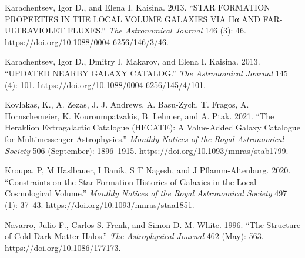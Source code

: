 \documentclass[
]{article}
\newlength{\cslhangindent}
\newenvironment{CSLReferences}[2] %
 {\begin{list}{}{%
  \setlength{\itemindent}{0pt}
  \setlength{\leftmargin}{0pt}
  \setlength{\parsep}{0pt}
  \ifodd #1
   \setlength{\leftmargin}{\cslhangindent}
   \setlength{\itemindent}{-1\cslhangindent}
  \fi
  \setlength{\itemsep}{#2\baselineskip}}}
 {\end{list}}
\begin{document}
\label{refs}
\begin{CSLReferences}{1}{0}
Karachentsev, Igor D., and Elena I. Kaisina. 2013. {``{STAR FORMATION
PROPERTIES IN THE LOCAL VOLUME GALAXIES VIA Hα AND FAR-ULTRAVIOLET
FLUXES}.''} \emph{The Astronomical Journal} 146 (3): 46.
\url{https://doi.org/10.1088/0004-6256/146/3/46}.

Karachentsev, Igor D., Dmitry I. Makarov, and Elena I. Kaisina. 2013.
{``{UPDATED NEARBY GALAXY CATALOG}.''} \emph{The Astronomical Journal}
145 (4): 101. \url{https://doi.org/10.1088/0004-6256/145/4/101}.

Kovlakas, K., A. Zezas, J. J. Andrews, A. Basu-Zych, T. Fragos, A.
Hornschemeier, K. Kouroumpatzakis, B. Lehmer, and A. Ptak. 2021. {``The
{Heraklion Extragalactic Catalogue} ({HECATE}): A Value-Added Galaxy
Catalogue for Multimessenger Astrophysics.''} \emph{Monthly Notices of
the Royal Astronomical Society} 506 (September): 1896--1915.
\url{https://doi.org/10.1093/mnras/stab1799}.

Kroupa, P, M Haslbauer, I Banik, S T Nagesh, and J Pflamm-Altenburg.
2020. {``Constraints on the Star Formation Histories of Galaxies in the
{Local Cosmological Volume}.''} \emph{Monthly Notices of the Royal
Astronomical Society} 497 (1): 37--43.
\url{https://doi.org/10.1093/mnras/staa1851}.

Navarro, Julio F., Carlos S. Frenk, and Simon D. M. White. 1996. {``The
{Structure} of {Cold Dark Matter Halos}.''} \emph{The Astrophysical
Journal} 462 (May): 563. \url{https://doi.org/10.1086/177173}.

\end{CSLReferences}
\end{document}
